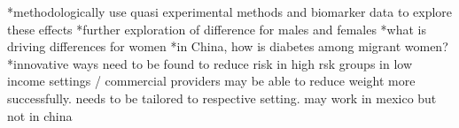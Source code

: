 *methodologically use quasi experimental methods and biomarker data to explore these effects 
*further exploration of difference for males and females
*what is driving differences for women
*in China, how is diabetes among migrant women?
*innovative ways need to be found to reduce risk in high rsk groups in low income settings / commercial providers may be able to reduce weight more successfully. needs to be tailored to respective setting. may work in mexico but not in china














